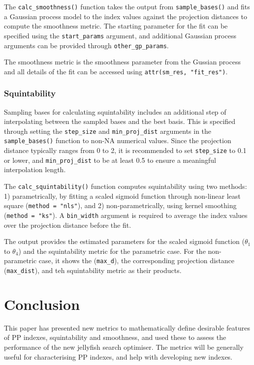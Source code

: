 \documentclass[
  12pt,
]{interact}
\theoremstyle{plain}
\begin{document}
The \texttt{calc\_smoothness()} function takes the output from
\texttt{sample\_bases()} and fits a Gaussian process model to the index
values against the projection distances to compute the smoothness
metric. The starting parameter for the fit can be specified using the
\texttt{start\_params} argument, and additional Gaussian process
arguments can be provided through \texttt{other\_gp\_params}.

The smoothness metric is the smoothness parameter from the Gussian
process and all details of the fit can be accessed using
\texttt{attr(sm\_res,\ "fit\_res")}.

\hypertarget{squintability}{%
\subsubsection{Squintability}\label{squintability}}

Sampling bases for calculating squintability includes an additional step
of interpolating between the sampled bases and the best basis. This is
specified through setting the \texttt{step\_size} and
\texttt{min\_proj\_dist} arguments in the \texttt{sample\_bases()}
function to non-NA numerical values. Since the projection distance
typically ranges from 0 to 2, it is recommended to set
\texttt{step\_size} to 0.1 or lower, and \texttt{min\_proj\_dist} to be
at least 0.5 to ensure a meaningful interpolation length.

The \texttt{calc\_squintability()} function computes squintability using
two methods: 1) parametrically, by fitting a scaled sigmoid function
through non-linear least square (\texttt{method\ =\ "nls"}), and 2)
non-parametrically, using kernel smoothing (\texttt{method\ =\ "ks"}). A
\texttt{bin\_width} argument is required to average the index values
over the projection distance before the fit.

The output provides the estimated parameters for the scaled sigmoid
function (\(\theta_1\) to \(\theta_4\)) and the squintability metric for
the parametric case. For the non-parametric case, it shows the
(\texttt{max\_d}), the corresponding projection distance
(\texttt{max\_dist}), and teh squintability metric as their products.

\hypertarget{sec-conclusion}{%
\section{Conclusion}\label{sec-conclusion}}

This paper has presented new metrics to mathematically define desirable
features of PP indexes, squintability and smoothness, and used these to
assess the performance of the new jellyfish search optimiser. The
metrics will be generally useful for characterising PP indexes, and help
with developing new indexes.
\end{document}

